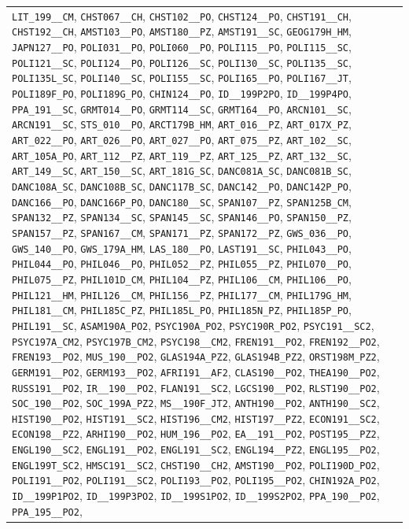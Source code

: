 \begin{longtable}{|p{4.4in}|p{4.4in}|}
\verb|LIT_199__CM|, \verb|CHST067__CH|, \verb|CHST102__PO|, \verb|CHST124__PO|, \verb|CHST191__CH|, \verb|CHST192__CH|, \verb|AMST103__PO|, \verb|AMST180__PZ|, \verb|AMST191__SC|, \verb|GEOG179H_HM|, \verb|JAPN127__PO|, \verb|POLI031__PO|, \verb|POLI060__PO|, \verb|POLI115__PO|, \verb|POLI115__SC|, \verb|POLI121__SC|, \verb|POLI124__PO|, \verb|POLI126__SC|, \verb|POLI130__SC|, \verb|POLI135__SC|, \verb|POLI135L_SC|, \verb|POLI140__SC|, \verb|POLI155__SC|, \verb|POLI165__PO|, \verb|POLI167__JT|, \verb|POLI189F_PO|, \verb|POLI189G_PO|, \verb|CHIN124__PO|, \verb|ID__199P2PO|, \verb|ID__199P4PO|, \verb|PPA_191__SC|, \verb|GRMT014__PO|, \verb|GRMT114__SC|, \verb|GRMT164__PO|, \verb|ARCN101__SC|, \verb|ARCN191__SC|, \verb|STS_010__PO|, \verb|ARCT179B_HM|, \verb|ART_016__PZ|, \verb|ART_017X_PZ|, \verb|ART_022__PO|, \verb|ART_026__PO|, \verb|ART_027__PO|, \verb|ART_075__PZ|, \verb|ART_102__SC|, \verb|ART_105A_PO|, \verb|ART_112__PZ|, \verb|ART_119__PZ|, \verb|ART_125__PZ|, \verb|ART_132__SC|, \verb|ART_149__SC|, \verb|ART_150__SC|, \verb|ART_181G_SC|, \verb|DANC081A_SC|, \verb|DANC081B_SC|, \verb|DANC108A_SC|, \verb|DANC108B_SC|, \verb|DANC117B_SC|, \verb|DANC142__PO|, \verb|DANC142P_PO|, \verb|DANC166__PO|, \verb|DANC166P_PO|, \verb|DANC180__SC|, \verb|SPAN107__PZ|, \verb|SPAN125B_CM|, \verb|SPAN132__PZ|, \verb|SPAN134__SC|, \verb|SPAN145__SC|, \verb|SPAN146__PO|, \verb|SPAN150__PZ|, \verb|SPAN157__PZ|, \verb|SPAN167__CM|, \verb|SPAN171__PZ|, \verb|SPAN172__PZ|, \verb|GWS_036__PO|, \verb|GWS_140__PO|, \verb|GWS_179A_HM|, \verb|LAS_180__PO|, \verb|LAST191__SC|, \verb|PHIL043__PO|, \verb|PHIL044__PO|, \verb|PHIL046__PO|, \verb|PHIL052__PZ|, \verb|PHIL055__PZ|, \verb|PHIL070__PO|, \verb|PHIL075__PZ|, \verb|PHIL101D_CM|, \verb|PHIL104__PZ|, \verb|PHIL106__CM|, \verb|PHIL106__PO|, \verb|PHIL121__HM|, \verb|PHIL126__CM|, \verb|PHIL156__PZ|, \verb|PHIL177__CM|, \verb|PHIL179G_HM|, \verb|PHIL181__CM|, \verb|PHIL185C_PZ|, \verb|PHIL185L_PO|, \verb|PHIL185N_PZ|, \verb|PHIL185P_PO|, \verb|PHIL191__SC|, \verb|ASAM190A_PO2|, \verb|PSYC190A_PO2|, \verb|PSYC190R_PO2|, \verb|PSYC191__SC2|, \verb|PSYC197A_CM2|, \verb|PSYC197B_CM2|, \verb|PSYC198__CM2|, \verb|FREN191__PO2|, \verb|FREN192__PO2|, \verb|FREN193__PO2|, \verb|MUS_190__PO2|, \verb|GLAS194A_PZ2|, \verb|GLAS194B_PZ2|, \verb|ORST198M_PZ2|, \verb|GERM191__PO2|, \verb|GERM193__PO2|, \verb|AFRI191__AF2|, \verb|CLAS190__PO2|, \verb|THEA190__PO2|, \verb|RUSS191__PO2|, \verb|IR__190__PO2|, \verb|FLAN191__SC2|, \verb|LGCS190__PO2|, \verb|RLST190__PO2|, \verb|SOC_190__PO2|, \verb|SOC_199A_PZ2|, \verb|MS__190F_JT2|, \verb|ANTH190__PO2|, \verb|ANTH190__SC2|, \verb|HIST190__PO2|, \verb|HIST191__SC2|, \verb|HIST196__CM2|, \verb|HIST197__PZ2|, \verb|ECON191__SC2|, \verb|ECON198__PZ2|, \verb|ARHI190__PO2|, \verb|HUM_196__PO2|, \verb|EA__191__PO2|, \verb|POST195__PZ2|, \verb|ENGL190__SC2|, \verb|ENGL191__PO2|, \verb|ENGL191__SC2|, \verb|ENGL194__PZ2|, \verb|ENGL195__PO2|, \verb|ENGL199T_SC2|, \verb|HMSC191__SC2|, \verb|CHST190__CH2|, \verb|AMST190__PO2|, \verb|POLI190D_PO2|, \verb|POLI191__PO2|, \verb|POLI191__SC2|, \verb|POLI193__PO2|, \verb|POLI195__PO2|, \verb|CHIN192A_PO2|, \verb|ID__199P1PO2|, \verb|ID__199P3PO2|, \verb|ID__199S1PO2|, \verb|ID__199S2PO2|, \verb|PPA_190__PO2|, \verb|PPA_195__PO2|, 
\end{longtable}
